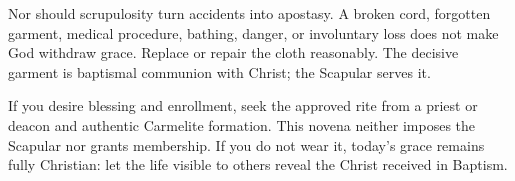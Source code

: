 Nor should scrupulosity turn accidents into apostasy. A broken cord, forgotten garment, medical procedure, bathing, danger, or involuntary loss does not make God withdraw grace. Replace or repair the cloth reasonably. The decisive garment is baptismal communion with Christ; the Scapular serves it.

If you desire blessing and enrollment, seek the approved rite from a priest or deacon and authentic Carmelite formation. This novena neither imposes the Scapular nor grants membership. If you do not wear it, today's grace remains fully Christian: let the life visible to others reveal the Christ received in Baptism.




